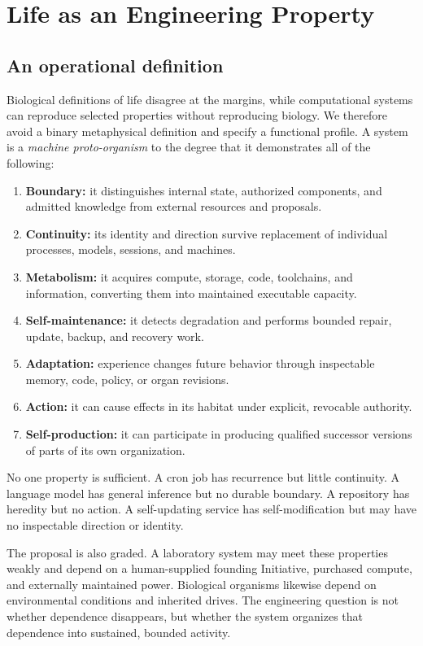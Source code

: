 \section{Life as an Engineering Property}

\subsection{An operational definition}

Biological definitions of life disagree at the margins, while computational
systems can reproduce selected properties without reproducing biology. We
therefore avoid a binary metaphysical definition and specify a functional
profile. A system is a \emph{machine proto-organism} to the degree that it
demonstrates all of the following:

\begin{enumerate}[leftmargin=*]
  \item \textbf{Boundary:} it distinguishes internal state, authorized
  components, and admitted knowledge from external resources and proposals.
  \item \textbf{Continuity:} its identity and direction survive replacement
  of individual processes, models, sessions, and machines.
  \item \textbf{Metabolism:} it acquires compute, storage, code, toolchains,
  and information, converting them into maintained executable capacity.
  \item \textbf{Self-maintenance:} it detects degradation and performs
  bounded repair, update, backup, and recovery work.
  \item \textbf{Adaptation:} experience changes future behavior through
  inspectable memory, code, policy, or organ revisions.
  \item \textbf{Action:} it can cause effects in its habitat under explicit,
  revocable authority.
  \item \textbf{Self-production:} it can participate in producing qualified
  successor versions of parts of its own organization.
\end{enumerate}

No one property is sufficient. A cron job has recurrence but little
continuity. A language model has general inference but no durable boundary. A
repository has heredity but no action. A self-updating service has
self-modification but may have no inspectable direction or identity.

The proposal is also graded. A laboratory system may meet these properties
weakly and depend on a human-supplied founding Initiative, purchased compute,
and externally maintained power. Biological organisms likewise depend on
environmental conditions and inherited drives. The engineering question is
not whether dependence disappears, but whether the system organizes that
dependence into sustained, bounded activity.

